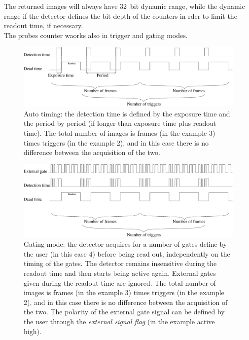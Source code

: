 \begin{description}
The returned images will always have 32~bit dynamic range, while the dynamic range if the detector defines the bit depth of the counters in rder to limit the readout time, if necessary.\\
The probes counter waorks also in trigger and gating modes.
\end{description}





\begin{figure}
\begin{center}
\includegraphics[width=\textwidth]{images/normal_acquisition.eps}
\end{center}
\caption{Auto timing: the detection time is defined by the exposure time and the period by period (if longer than exposure time plus readout time). The total number of images is frames (in the example 3) times triggers (in the example 2), and in this case there is no difference between the acquisition of the two.}\label{fig:autotiming}
\end{figure}

\begin{figure}
\begin{center}
\includegraphics[width=\textwidth]{images/gated_acquisition.eps}
\end{center}
\caption{Gating mode: the detector acquires for a number of gates define by the  user (in this case 4) before being read out, independently on the timing of the gates. The detector remains insensitive during the readout time and then starts being active again. External gates given during the readout time are ignored. The total number of images is frames (in the example 3) times triggers (in the example 2), and in this case there is no difference between the acquisition of the two. The polarity of the external gate signal can be defined by the user through the \textit{external signal flag} (in the example active high).}\label{fig:gating}
\end{figure}



